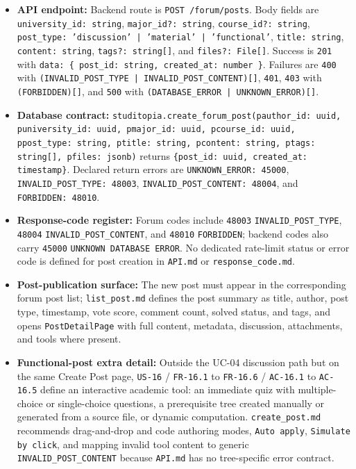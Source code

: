 \documentclass[12pt]{article}
\begin{document}
\begin{itemize}
\item \textbf{API endpoint:} Backend route is \texttt{POST /forum/posts}. Body fields are \texttt{university\_id: string}, \texttt{major\_id?: string}, \texttt{course\_id?: string}, \texttt{post\_type: 'discussion' | 'material' | 'functional'}, \texttt{title: string}, \texttt{content: string}, \texttt{tags?: string[]}, and \texttt{files?: File[]}. Success is \texttt{201} with \texttt{data: \{ post\_id: string, created\_at: number \}}. Failures are \texttt{400} with \texttt{(INVALID\_POST\_TYPE | INVALID\_POST\_CONTENT)[]}, \texttt{401}, \texttt{403} with \texttt{(FORBIDDEN)[]}, and \texttt{500} with \texttt{(DATABASE\_ERROR | UNKNOWN\_ERROR)[]}.
\item \textbf{Database contract:} \texttt{studitopia.create\_forum\_post(pauthor\_id: uuid, puniversity\_id: uuid, pmajor\_id: uuid, pcourse\_id: uuid, ppost\_type: string, ptitle: string, pcontent: string, ptags: string[], pfiles: jsonb)} returns \texttt{\{post\_id: uuid, created\_at: timestamp\}}. Declared return errors are \texttt{UNKNOWN\_ERROR: 45000}, \texttt{INVALID\_POST\_TYPE: 48003}, \texttt{INVALID\_POST\_CONTENT: 48004}, and \texttt{FORBIDDEN: 48010}.
\item \textbf{Response-code register:} Forum codes include \texttt{48003} \texttt{INVALID\_POST\_TYPE}, \texttt{48004} \texttt{INVALID\_POST\_CONTENT}, and \texttt{48010} \texttt{FORBIDDEN}; backend codes also carry \texttt{45000} \texttt{UNKNOWN DATABASE ERROR}. No dedicated rate-limit status or error code is defined for post creation in \texttt{API.md} or \texttt{response\_code.md}.
\item \textbf{Post-publication surface:} The new post must appear in the corresponding forum post list; \texttt{list\_post.md} defines the post summary as title, author, post type, timestamp, vote score, comment count, solved status, and tags, and opens \texttt{PostDetailPage} with full content, metadata, discussion, attachments, and tools where present.
\item \textbf{Functional-post extra detail:} Outside the UC-04 discussion path but on the same Create Post page, \texttt{US-16} / \texttt{FR-16.1} to \texttt{FR-16.6} / \texttt{AC-16.1} to \texttt{AC-16.5} define an interactive academic tool: an immediate quiz with multiple-choice or single-choice questions, a prerequisite tree created manually or generated from a source file, or dynamic computation. \texttt{create\_post.md} recommends drag-and-drop and code authoring modes, \texttt{Auto apply}, \texttt{Simulate by click}, and mapping invalid tool content to generic \texttt{INVALID\_POST\_CONTENT} because \texttt{API.md} has no tree-specific error contract.
\end{itemize}
\par\medskip
\end{document}
